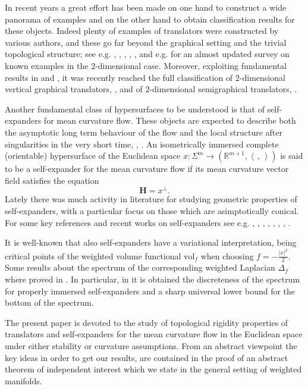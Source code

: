 \documentclass[11pt, leqno]{amsart}
\def\<{\left\langle}
\def\>{\right\rangle}
\def\<{\left\langle}
\def\>{\right\rangle}
\begin{document}
In recent years a great effort has been made on one hand to construct a wide panorama of examples and on the other hand to obtain classification results for these objects. Indeed plenty of examples of translators were constructed by various authors, and these go far beyond the graphical setting and the trivial topological structure; see e.g. \cite{CSS}, \cite{DDPN}, \cite{N1}, \cite{HMW22}, \cite{HMW_Annuli}, \cite{HMW_Scherk} and e.g. \cite{GMM22} for an almost updated survey on known examples in the $2$-dimensional case. Moreover, exploiting fundamental results in \cite{W} and \cite{SX}, it was recently reached the full classification of 2-dimensional vertical graphical translators, \cite{HIMW}, and of $2$-dimensional semigraphical translators, \cite{HMW22}. 

\medskip

Another fundamental class of hypersurfaces to be understood is that of self-expanders for mean curvature flow. These objects are expected to describe both the asymptotic long term behaviour of the flow and the local structure after singularities in the very short time, \cite{EckerHuisken}, \cite{Stavrou} \cite{AIC}. An isometrically immersed complete (orientable) hypersurface of the Euclidean space $x:\Sigma^m\to(\mathbb{R}^{m+1}, \<\,,\,\>)$ is said to be a self-expander for the mean curvature flow if its mean curvature vector field satisfies the equation
\begin{equation}\label{SE}
\mathbf{H}=x^{\bot}.
\end{equation}
Lately there was much activity in literature for studying geometric properties of self-expanders, with a particular focus on those which are asimptotically conical. For some key references and recent works on self-expanders see e.g. \cite{I}, \cite{Ding} \cite{BW1}, \cite{BW2}, \cite{Helmensdorfer}, \cite{Smoczyk}, \cite{FMG}, \cite{ChengZhou_Selfexp}, \cite{AncariCheng_GeoDed}.

It is well-known that also self-expanders have a variational interpretation, being critical points of the weighted volume functional $\mathrm{vol}_{f}$ when choosing $f=-\frac{|x|^2}{2}$. Some results  about the spectrum of the corresponding weighted Laplacian $\Delta_f$ where proved in \cite{ChengZhou_Selfexp}. In particular, in \cite{ChengZhou_Selfexp} it is obtained the discreteness of the spectrum for properly immersed self-expanders and a sharp universal lower bound for the bottom of the spectrum. 
\medskip

The present paper is devoted to the study of topological rigidity properties of translators and self-expanders for the mean curvature flow in the Euclidean space under either stability or curvature assumptions. From an abstract viewpoint the key ideas in order to get our results, are contained in the proof of an abstract theorem of independent interest which we state in the general setting of weighted manifolds. 
\end{document}
